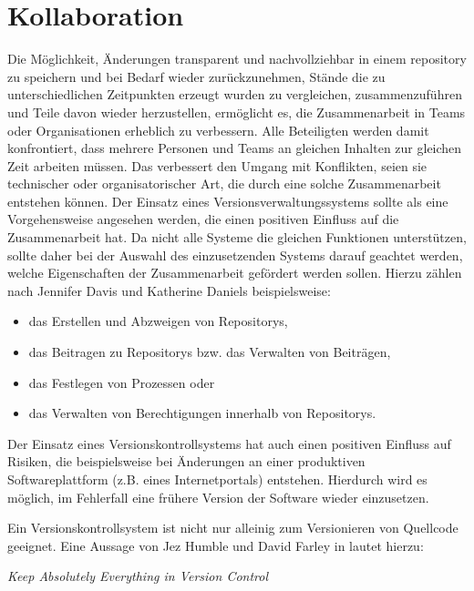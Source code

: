 \section{Kollaboration}\label{sec:collaboration}
Die Möglichkeit, Änderungen transparent und nachvollziehbar in einem
\gls{repository} zu speichern und bei Bedarf wieder zurückzunehmen, Stände die
zu unterschiedlichen Zeitpunkten erzeugt wurden zu vergleichen,
zusammenzuführen und Teile davon wieder herzustellen, ermöglicht es, die
Zusammenarbeit in Teams oder Organisationen erheblich zu verbessern. Alle
Beteiligten werden damit konfrontiert, dass mehrere Personen und Teams an
gleichen Inhalten zur gleichen Zeit arbeiten müssen. Das verbessert den Umgang
mit Konflikten, seien sie technischer oder organisatorischer Art, die durch
eine solche Zusammenarbeit entstehen können. Der Einsatz eines
Versionsverwaltungssystems sollte als eine Vorgehensweise angesehen werden, die
einen positiven Einfluss auf die Zusammenarbeit hat. Da nicht alle Systeme die
gleichen Funktionen unterstützen, sollte daher bei der Auswahl des
einzusetzenden Systems darauf geachtet werden, welche Eigenschaften der
Zusammenarbeit gefördert werden sollen. Hierzu zählen nach Jennifer Davis und
Katherine Daniels \cite[S.~178]{effdo} beispielsweise:

\begin{itemize}
\item das Erstellen und Abzweigen von Repositorys,
\item das Beitragen zu Repositorys bzw. das Verwalten von Beiträgen,
\item das Festlegen von Prozessen oder
\item das Verwalten von Berechtigungen innerhalb von Repositorys.
\end{itemize}

Der Einsatz eines Versionskontrollsystems hat auch einen positiven Einfluss auf
Risiken, die beispielsweise bei Änderungen an einer produktiven
Softwareplattform (z.B.  eines Internetportals) entstehen. Hierdurch wird es
möglich, im Fehlerfall eine frühere Version der Software wieder einzusetzen.
 \cite[S.~178]{effdo}

Ein Versionskontrollsystem ist nicht nur alleinig zum Versionieren von Quellcode geeignet.
Eine Aussage von Jez Humble und David Farley in \cite[S.~33]{cd} lautet hierzu:

\begin{center}
\textit{\glqq{}Keep Absolutely Everything in Version Control\grqq{}}
\end{center}

